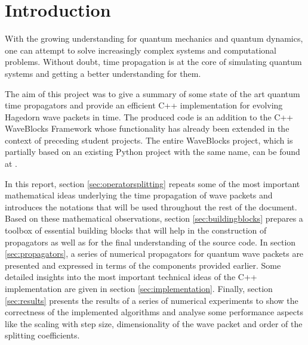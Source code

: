 \section*{Introduction}
%
With the growing understanding for quantum mechanics and quantum dynamics, one can attempt to solve increasingly complex systems and computational problems.
Without doubt, time propagation is at the core of simulating quantum systems and getting a better understanding for them.
\par\medskip
%
The aim of this project was to give a summary of some state of the art quantum time propagators and provide an efficient C++ implementation for evolving Hagedorn wave packets in time.
The produced code is an addition to the C++ WaveBlocks Framework whose functionality has already been extended in the context of preceding student projects.
The entire WaveBlocks project, which is partially based on an existing Python project with the same name, can be found at \cite{libwaveblocks}.
\par\medskip
%
In this report, section \ref{sec:operatorsplitting} repeats some of the most important mathematical ideas underlying the time propagation of wave packets and introduces the notations that will be used throughout the rest of the document.
Based on these mathematical observations, section \ref{sec:buildingblocks} prepares a toolbox of essential building blocks that will help in the construction of propagators as well as for the final understanding of the source code.
In section \ref{sec:propagators}, a series of numerical propagators for quantum wave packets are presented and expressed in terms of the components provided earlier.
Some detailed insights into the most important technical ideas of the C++ implementation are given in section \ref{sec:implementation}.
Finally, section \ref{sec:results} presents the results of a series of numerical experiments to show the correctness of the implemented algorithms and analyse some performance aspects like the scaling with step size, dimensionality of the wave packet and order of the splitting coefficients.
